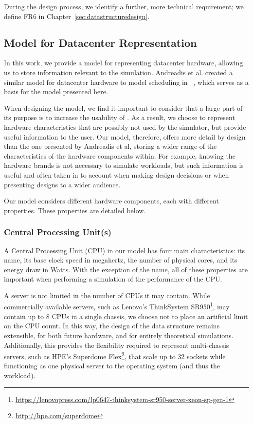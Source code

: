 \documentclass[11pt]{article}
\begin{document}
		During the design process, we identify a further, more technical requirement; we define FR6 in Chapter~\ref{sec:datastructuredesign}.

	\subsection{Model for Datacenter Representation} \label{sec:datacentermodel}
		In this work, we provide a model for representing datacenter hardware, allowing us to store information  relevant to the simulation. Andreadis et al. created a similar model for datacenter hardware to model scheduling in \opendc{}~\cite{Andreadis2018}, which serves as a basis for the model presented here. 
		
		When designing the model, we find it important to consider that a large part of its purpose is to increase the usability of \opendc{}. 
		As a result, we choose to represent hardware characteristics that are possibly not used by the simulator, but provide useful information to the user. 
		Our model, therefore, offers more detail by design than the one presented by Andreadis et al, storing a wider range of the characteristics of the hardware components within.
		For example, knowing the hardware brands is not necessary to simulate workloads, but such information is useful and often taken in to account when making design decisions or when presenting designs to a wider audience.

		Our model considers different hardware components, each with different properties.
		These properties are detailed below.

		\subsubsection{Central Processing Unit(s)}
			A Central Processing Unit (CPU) in our model has four main characteristics: its name, its base clock speed in megahertz, the number of physical cores, and its energy draw in Watts.
			With the exception of the name, all of these properties are important when performing a simulation of the performance of the CPU.
			
			A server is not limited in the number of CPUs it may contain.
			While commercially available servers, such as Lenovo's ThinkSystem SR950\footnote{\url{https://lenovopress.com/lp0647-thinksystem-sr950-server-xeon-sp-gen-1}}, may contain up to 8 CPUs in a single chassis, we choose not to place an artificial limit on the CPU count.
			In this way, the design of the data structure remains extensible, for both future hardware, and for entirely theoretical simulations.
			Additionally, this provides the flexibility required to represent multi-chassis servers, such as HPE's Superdome Flex\footnote{\url{http://hpe.com/superdome}}, that scale up to 32 sockets while functioning as one physical server to the operating system (and thus the workload).
\end{document}
